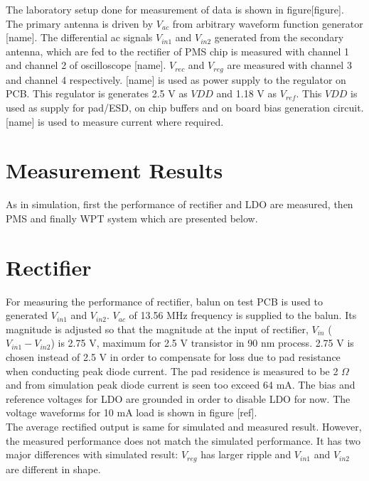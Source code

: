 \documentclass[12pt,a4paper,UKenglish]{article}
\begin{document}
The laboratory setup done for measurement of data is shown in figure[figure]. The primary antenna is driven by $V_{ac}$ from arbitrary waveform function generator [name]. The differential ac signals  $V_{in1}$ and $V_{in2}$ generated from the secondary antenna, which are fed to the rectifier of PMS chip is measured with channel 1 and channel 2 of oscilloscope [name]. $V_{rec}$ and $V_{reg}$ are measured with channel 3 and channel 4 respectively. [name] is used as power supply to the regulator on PCB. This regulator is generates 2.5 V as $VDD$ and 1.18 V as $V_{ref}$. This $VDD$ is used as supply for pad/ESD, on chip buffers and on board bias generation circuit. [name] is used to measure current where required. 

\section{Measurement Results}
As in simulation, first the performance of rectifier and LDO are measured, then PMS and finally WPT system which are presented below. 

\section{Rectifier}
For measuring the performance of rectifier, balun on test PCB is used to generated $V_{in1}$ and $V_{in2}$.  $V_{ac}$ of 13.56 MHz frequency is supplied to the balun. Its magnitude is adjusted so that the magnitude at the input of rectifier, $V_{in}$ ($V_{in1} -V_{in2}$) is 2.75 V, maximum for 2.5 V transistor in 90 nm process. 2.75 V is chosen instead of 2.5 V in order to compensate for loss due to pad resistance when conducting peak diode current. The pad residence is measured to be 2 $\Omega$ and from simulation peak diode current is seen too exceed 64 mA. The bias and reference voltages for LDO are grounded in order to disable LDO for now. The voltage waveforms for 10 mA load is shown in figure [ref]. \\

The average rectified output is same for simulated and measured result. However,  the measured performance does not match the simulated performance. It has two major differences with simulated result: $V_{reg}$ has larger ripple and $V_{in1}$ and $V_{in2}$ are different in shape. 
\end{document}
